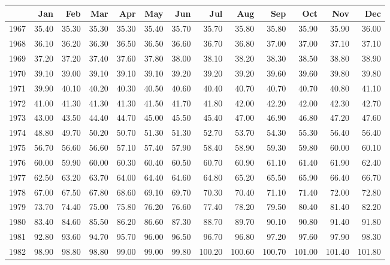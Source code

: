 \begin{longtable}{rrrrrrrrrrrrr}
  \hline
 & Jan & Feb & Mar & Apr & May & Jun & Jul & Aug & Sep & Oct & Nov & Dec \\ 
  \hline
1967 & 35.40 & 35.30 & 35.30 & 35.30 & 35.40 & 35.70 & 35.70 & 35.80 & 35.80 & 35.90 & 35.90 & 36.00 \\ 
  1968 & 36.10 & 36.20 & 36.30 & 36.50 & 36.50 & 36.60 & 36.70 & 36.80 & 37.00 & 37.00 & 37.10 & 37.10 \\ 
  1969 & 37.20 & 37.20 & 37.40 & 37.60 & 37.80 & 38.00 & 38.10 & 38.20 & 38.30 & 38.50 & 38.80 & 38.90 \\ 
  1970 & 39.10 & 39.00 & 39.10 & 39.10 & 39.10 & 39.20 & 39.20 & 39.20 & 39.60 & 39.60 & 39.80 & 39.80 \\ 
  1971 & 39.90 & 40.10 & 40.20 & 40.30 & 40.50 & 40.60 & 40.40 & 40.70 & 40.70 & 40.70 & 40.80 & 41.10 \\ 
  1972 & 41.00 & 41.30 & 41.30 & 41.30 & 41.50 & 41.70 & 41.80 & 42.00 & 42.20 & 42.00 & 42.30 & 42.70 \\ 
  1973 & 43.00 & 43.50 & 44.40 & 44.70 & 45.00 & 45.50 & 45.40 & 47.00 & 46.90 & 46.80 & 47.20 & 47.60 \\ 
  1974 & 48.80 & 49.70 & 50.20 & 50.70 & 51.30 & 51.30 & 52.70 & 53.70 & 54.30 & 55.30 & 56.40 & 56.40 \\ 
  1975 & 56.70 & 56.60 & 56.60 & 57.10 & 57.40 & 57.90 & 58.40 & 58.90 & 59.30 & 59.80 & 60.00 & 60.10 \\ 
  1976 & 60.00 & 59.90 & 60.00 & 60.30 & 60.40 & 60.50 & 60.70 & 60.90 & 61.10 & 61.40 & 61.90 & 62.40 \\ 
  1977 & 62.50 & 63.20 & 63.70 & 64.00 & 64.40 & 64.60 & 64.80 & 65.20 & 65.50 & 65.90 & 66.40 & 66.70 \\ 
  1978 & 67.00 & 67.50 & 67.80 & 68.60 & 69.10 & 69.70 & 70.30 & 70.40 & 71.10 & 71.40 & 72.00 & 72.80 \\ 
  1979 & 73.70 & 74.40 & 75.00 & 75.80 & 76.20 & 76.60 & 77.40 & 78.20 & 79.50 & 80.40 & 81.40 & 82.20 \\ 
  1980 & 83.40 & 84.60 & 85.50 & 86.20 & 86.60 & 87.30 & 88.70 & 89.70 & 90.10 & 90.80 & 91.40 & 91.80 \\ 
  1981 & 92.80 & 93.60 & 94.70 & 95.70 & 96.00 & 96.50 & 96.70 & 96.80 & 97.20 & 97.60 & 97.90 & 98.30 \\ 
  1982 & 98.90 & 98.80 & 98.80 & 99.00 & 99.00 & 99.80 & 100.20 & 100.60 & 100.70 & 101.00 & 101.40 & 101.80 \\ 

\end{longtable}
